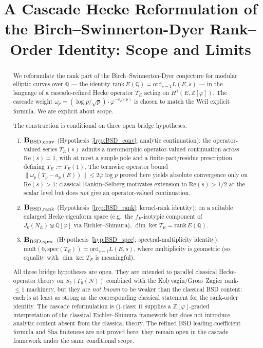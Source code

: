 \documentclass[11pt, a4paper]{amsart}
\title{A Cascade Hecke Reformulation of the Birch--Swinnerton-Dyer Rank--Order Identity: Scope and Limits}
\author{}
\date{}
\theoremstyle{definition}
\newcommand{\Q}{\mathbb{Q}}
\newcommand{\Z}{\mathbb{Z}}
\newcommand{\pphi}{\varphi}
\begin{document}
\maketitle

\begin{abstract}
We reformulate the rank part of the Birch--Swinnerton-Dyer
conjecture for modular elliptic curves over $\Q$ — the identity
$\mathrm{rank}\, E(\Q) = \mathrm{ord}_{s=1} L(E, s)$ — in the
language of a cascade-refined Hecke operator $T_E$ acting on
$H^1(E, \Z[\pphi])$. The cascade weight $\omega_p = (\log p /
\sqrt{p}) \cdot \pphi^{-v_\pphi(p)}$ is chosen to match the Weil
explicit formula. We are explicit about scope.

The construction is conditional on three open bridge hypotheses:
\begin{enumerate}
\item \textbf{$\mathbf{B_{\rm BSD,conv}}$}
  (Hypothesis~\ref{hyp:BSD_conv}; analytic continuation):
  the operator-valued series $T_E(s)$ admits a meromorphic
  operator-valued continuation across $\mathrm{Re}(s) = 1$, with at
  most a simple pole and a finite-part/residue prescription
  defining $T_E := T_E(1)$. The termwise operator bound
  $\|\omega_p(T_p - a_p(E))\| \le 2 \varphi \log p$ proved here
  yields absolute convergence only on $\mathrm{Re}(s) > 1$;
  classical Rankin--Selberg motivates extension to
  $\mathrm{Re}(s) > 1/2$ at the scalar level but does \emph{not}
  give an operator-valued continuation.
\item \textbf{$\mathbf{B_{\rm BSD,rank}}$}
  (Hypothesis~\ref{hyp:BSD_rank}; kernel-rank identity):
  on a suitable enlarged Hecke eigenform space (e.g.\ the
  $f_E$-isotypic component of $J_0(N_E) \otimes \Q[\pphi]$ via
  Eichler--Shimura), $\dim\ker T_E = \mathrm{rank}\,E(\Q)$.
\item \textbf{$\mathbf{B_{\rm BSD,spec}}$}
  (Hypothesis~\ref{hyp:BSD_spec}; spectral-multiplicity identity):
  $\mathrm{mult}(0, \mathrm{spec}(T_E)) = \mathrm{ord}_{s=1} L(E, s)$,
  where multiplicity is geometric (so equality with
  $\dim\ker T_E$ is meaningful).
\end{enumerate}

All three bridge hypotheses are open. They are intended to parallel
classical Hecke-operator theory on $S_2(\Gamma_0(N))$ combined with
the Kolyvagin/Gross--Zagier rank-$\le 1$ machinery, but they are
\emph{not known} to be weaker than the classical BSD content: each
is at least as strong as the corresponding classical statement for
the rank-order identity. The cascade reformulation is
(\textdelta)-class: it supplies a $\Z[\pphi]$-graded
interpretation of the classical Eichler--Shimura framework but
does not introduce analytic content absent from the classical
theory. The refined BSD
leading-coefficient formula and Sha finiteness are not proved
here; they remain open in the cascade framework under the same
conditional scope.
\end{abstract}
\end{document}
